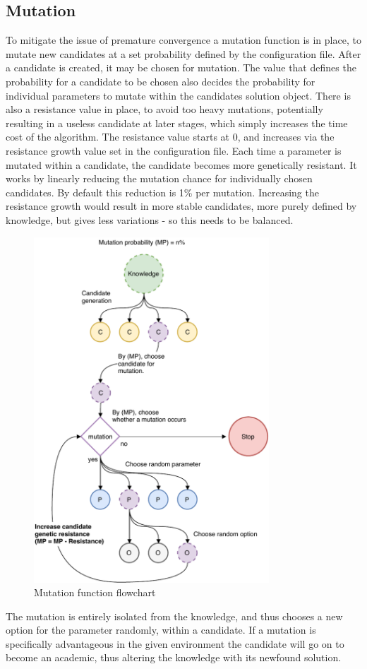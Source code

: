 \documentclass[a4paper,english]{report}
\begin{document}
		\subsection{Mutation}
		To mitigate the issue of premature convergence a mutation function is in place, to mutate new candidates at a set probability defined by the configuration file. After a candidate is created, it may be chosen for mutation. The value that defines the probability for a candidate to be chosen also decides the probability for individual parameters to mutate within the candidates solution object. There is also a resistance value in place, to avoid too heavy mutations, potentially resulting in a useless candidate at later stages, which simply increases the time cost of the algorithm. The resistance value starts at 0, and increases via the resistance growth value set in the configuration file. Each time a parameter is mutated within a candidate, the candidate becomes more genetically resistant. It works by linearly reducing the mutation chance for individually chosen candidates. By default this reduction is 1\% per mutation. Increasing the resistance growth would result in more stable candidates, more purely defined by knowledge, but gives less variations - so this needs to be balanced. 
		\begin{figure}[H]
			\centering
			\includegraphics[width=250pt]{Mutation}
			\caption{Mutation function flowchart}
			\label{fig:mutation}
		\end{figure}
		The mutation is entirely isolated from the knowledge, and thus chooses a new option for the parameter randomly, within a candidate. If a mutation is specifically advantageous in the given environment the candidate will go on to become an academic, thus altering the knowledge with its newfound solution.
\end{document}
